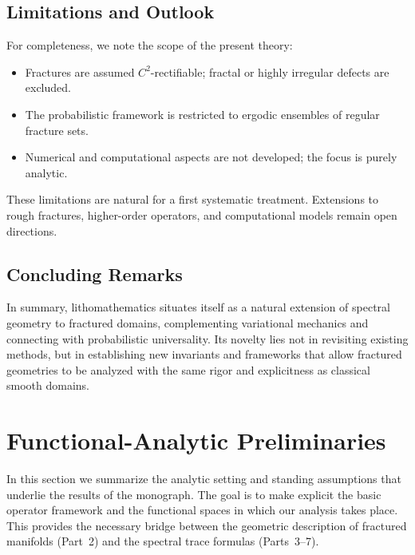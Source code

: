\subsection{Limitations and Outlook}

For completeness, we note the scope of the present theory:

\begin{itemize}
  \item Fractures are assumed $C^2$-rectifiable; fractal or highly irregular
  defects are excluded.
  \item The probabilistic framework is restricted to ergodic ensembles of
  regular fracture sets.
  \item Numerical and computational aspects are not developed; the focus is
  purely analytic.
\end{itemize}

These limitations are natural for a first systematic treatment. Extensions to
rough fractures, higher-order operators, and computational models remain open
directions.

\subsection{Concluding Remarks}

In summary, lithomathematics situates itself as a natural extension of spectral
geometry to fractured domains, complementing variational mechanics and
connecting with probabilistic universality. Its novelty lies not in revisiting
existing methods, but in establishing new invariants and frameworks that allow
fractured geometries to be analyzed with the same rigor and explicitness as
classical smooth domains.


\section{Functional-Analytic Preliminaries}

In this section we summarize the analytic setting and standing assumptions
that underlie the results of the monograph. The goal is to make explicit the
basic operator framework and the functional spaces in which our analysis takes
place. This provides the necessary bridge between the geometric description of
fractured manifolds (Part~2) and the spectral trace formulas (Parts~3–7).


